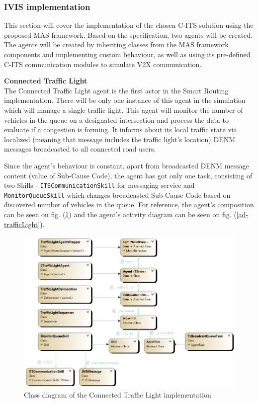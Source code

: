 \documentclass[main.tex]{subfiles}
\begin{document}
\subsubsection{IVIS implementation}

This section will cover the implementation of the chosen C-ITS solution using the proposed 
MAS framework. Based on the specification, two agents will be created. The agents will be 
created by inheriting classes from the MAS framework components and implementing custom behaviour, as 
well as using its pre-defined C-ITS communication modules to simulate V2X communication. 

\textbf{Connected Traffic Light} \smallskip \\
The Connected Traffic Light agent is the first actor in the Smart Routing implementation.
There will be only one instance of this agent in the simulation which will manage a 
single traffic light. This agent will monitor the number of vehicles in the queue on a
designated intersection and process the data to evaluate if a congestion is forming. It informs
about its local traffic state via localized (meaning that message includes the traffic light's
location) DENM messages broadcasted to all connected road users.

Since the agent's behaviour is constant, apart from broadcasted DENM message content (value of
Sub-Cause Code), the agent has got only one task, consisting of two Skills - 
\texttt{ITSCommunicationSkill} for messaging service and \texttt{MonitorQueueSkill} which 
changes broadcasted Sub-Cause Code based on discovered number of vehicles in the queue. 
For reference, the agent's composition can be seen on fig. (\ref{cd-trafficLight}) and 
the agent's activity diagram can be seen on fig. (\ref{ad-trafficLight}).


\begin{figure}[htbp]
    \centering
    \includegraphics[width=.9\textwidth]{cd-SmartTrafficLight.png}
    \caption{Class diagram of the Connected Traffic Light implementation}
    \label{cd-trafficLight}
\end{figure}
\end{document}
